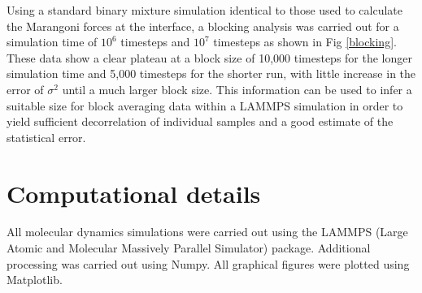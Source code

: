 Using a standard binary mixture simulation identical to those used to calculate the Marangoni forces at the interface, a blocking analysis was carried out for a simulation time of $10^{6}$ timesteps and $10^{7}$ timesteps as shown in Fig \ref{blocking}.
These data show a clear plateau at a block size of 10,000 timesteps for the longer simulation time and 5,000 timesteps for the shorter run, with little increase in the error of $\sigma^{2}$ until a much larger block size.
This information can be used to infer a suitable size for block averaging data within a LAMMPS simulation in order to yield sufficient decorrelation of individual samples and a good estimate of the statistical error. 

\section{Computational details}
All molecular dynamics simulations were carried out using the LAMMPS (Large Atomic and Molecular Massively Parallel Simulator) package.\cite{LAMMPS}
Additional processing was carried out using Numpy.\cite{NumPy}
All graphical figures were plotted using Matplotlib.\cite{MatPlotLib}

